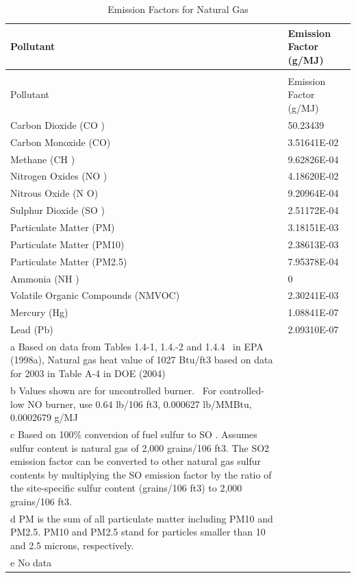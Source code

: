 \begin{longtable}[c]{p{4.5in}p{1.5in}}
\caption{Emission Factors for Natural Gas \label{table:emission-factors-for-natural-gas}} \tabularnewline
\toprule 
Pollutant & Emission Factor  ~~ (g/MJ) \tabularnewline
\midrule
\endfirsthead

\caption[]{Emission Factors for Natural Gas} \tabularnewline
\toprule 
Pollutant & Emission Factor  ~~ (g/MJ) \tabularnewline
\midrule
\endhead

Carbon Dioxide (CO  ) & 50.23439 \tabularnewline
Carbon Monoxide (CO) & 3.51641E-02 \tabularnewline
Methane (CH  ) & 9.62826E-04 \tabularnewline
Nitrogen Oxides (NO  ) & 4.18620E-02 \tabularnewline
Nitrous Oxide (N  O) & 9.20964E-04 \tabularnewline
Sulphur Dioxide (SO  ) & 2.51172E-04 \tabularnewline
Particulate Matter (PM) & 3.18151E-03 \tabularnewline
Particulate Matter (PM10) & 2.38613E-03 \tabularnewline
Particulate Matter (PM2.5) & 7.95378E-04 \tabularnewline
Ammonia (NH  ) & 0 \tabularnewline
Volatile Organic Compounds (NMVOC) & 2.30241E-03 \tabularnewline
Mercury (Hg) & 1.08841E-07 \tabularnewline
Lead (Pb) & 2.09310E-07 \tabularnewline
a Based on data from Tables 1.4-1, 1.4.-2 and 1.4.4~ in EPA (1998a), Natural gas heat value of 1027 Btu/ft3 based on data for 2003 in Table A-4 in DOE (2004) \tabularnewline
b Values shown are for uncontrolled burner.~ For controlled-low NO   burner, use 0.64 lb/106 ft3, 0.000627 lb/MMBtu, 0.0002679 g/MJ \tabularnewline
c Based on 100\% conversion of fuel sulfur to SO  . Assumes sulfur content is natural gas of 2,000 grains/106 ft3. The SO2 emission factor can be converted to other natural gas sulfur contents by multiplying the SO   emission factor by the ratio of the site-specific sulfur content (grains/106 ft3) to 2,000 grains/106 ft3. \tabularnewline
d PM is the sum of all particulate matter including PM10 and PM2.5. PM10 and PM2.5 stand for particles smaller than 10 and 2.5 microns, respectively. \tabularnewline
e No data \tabularnewline
\bottomrule
\end{longtable}

